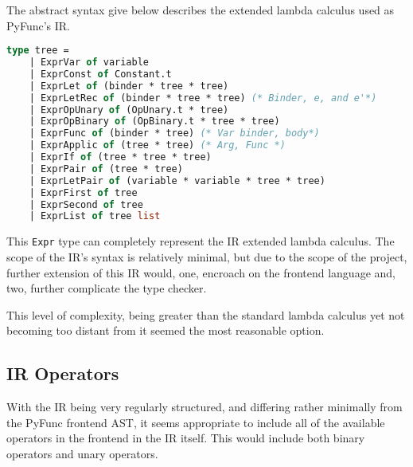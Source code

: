 \documentclass{l4proj}
\begin{document}
The abstract syntax give below describes the extended lambda calculus used as PyFunc's IR.

\begin{lstlisting}[language=Caml, caption=The Abstract Syntax for the IR, ]
type tree = 
    | ExprVar of variable
    | ExprConst of Constant.t
    | ExprLet of (binder * tree * tree)
    | ExprLetRec of (binder * tree * tree) (* Binder, e, and e'*)
    | ExprOpUnary of (OpUnary.t * tree)
    | ExprOpBinary of (OpBinary.t * tree * tree)
    | ExprFunc of (binder * tree) (* Var binder, body*)
    | ExprApplic of (tree * tree) (* Arg, Func *)
    | ExprIf of (tree * tree * tree)
    | ExprPair of (tree * tree)
    | ExprLetPair of (variable * variable * tree * tree)
    | ExprFirst of tree
    | ExprSecond of tree
    | ExprList of tree list
\end{lstlisting}


This \texttt{Expr} type can completely represent the IR extended lambda calculus. 
The scope of the IR's syntax is relatively minimal, but due to the scope of the project, further extension of this IR would, one, encroach on the frontend language and, two, further complicate the type checker.

This level of complexity, being greater than the standard lambda calculus yet not becoming too distant from it seemed the most reasonable option.

\subsection*{IR Operators}
With the IR being very regularly structured, and differing rather minimally from the PyFunc frontend AST, it seems appropriate to include all of the available operators in the frontend in the IR itself.
This would include both binary operators and unary operators.
\end{document}
